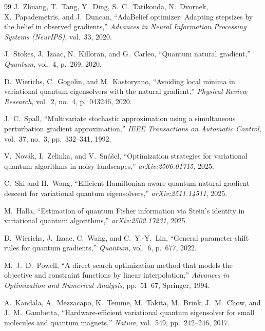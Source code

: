 \documentclass[11pt,a4paper]{article}
\begin{document}
\begin{thebibliography}{99}
J.~Zhuang, T.~Tang, Y.~Ding, S.~C.~Tatikonda, N.~Dvornek, X.~Papademetris, and J.~Duncan,
\newblock ``AdaBelief optimizer: Adapting stepsizes by the belief in observed gradients,''
\newblock \emph{Advances in Neural Information Processing Systems (NeurIPS)}, vol.~33, 2020.

J.~Stokes, J.~Izaac, N.~Killoran, and G.~Carleo,
\newblock ``Quantum natural gradient,''
\newblock \emph{Quantum}, vol.~4, p.~269, 2020.

D.~Wierichs, C.~Gogolin, and M.~Kastoryano,
\newblock ``Avoiding local minima in variational quantum eigensolvers with the natural gradient,''
\newblock \emph{Physical Review Research}, vol.~2, no.~4, p.~043246, 2020.

J.~C.~Spall,
\newblock ``Multivariate stochastic approximation using a simultaneous perturbation gradient approximation,''
\newblock \emph{IEEE Transactions on Automatic Control}, vol.~37, no.~3, pp.~332--341, 1992.

V.~Nov{\'a}k, I.~Zelinka, and V.~Sn{\'a}{\v{s}}el,
\newblock ``Optimization strategies for variational quantum algorithms in noisy landscapes,''
\newblock \emph{arXiv:2506.01715}, 2025.

C.~Shi and H.~Wang,
\newblock ``Efficient Hamiltonian-aware quantum natural gradient descent for variational quantum eigensolvers,''
\newblock \emph{arXiv:2511.14511}, 2025.

M.~Halla,
\newblock ``Estimation of quantum Fisher information via Stein's identity in variational quantum algorithms,''
\newblock \emph{arXiv:2502.17231}, 2025.

D.~Wierichs, J.~Izaac, C.~Wang, and C.~Y.-Y.~Lin,
\newblock ``General parameter-shift rules for quantum gradients,''
\newblock \emph{Quantum}, vol.~6, p.~677, 2022.

M.~J.~D.~Powell,
\newblock ``A direct search optimization method that models the objective and constraint functions by linear interpolation,''
\newblock \emph{Advances in Optimization and Numerical Analysis}, pp.~51--67, Springer, 1994.

A.~Kandala, A.~Mezzacapo, K.~Temme, M.~Takita, M.~Brink, J.~M.~Chow, and J.~M.~Gambetta,
\newblock ``Hardware-efficient variational quantum eigensolver for small molecules and quantum magnets,''
\newblock \emph{Nature}, vol.~549, pp.~242--246, 2017.


\end{thebibliography}
\end{document}

